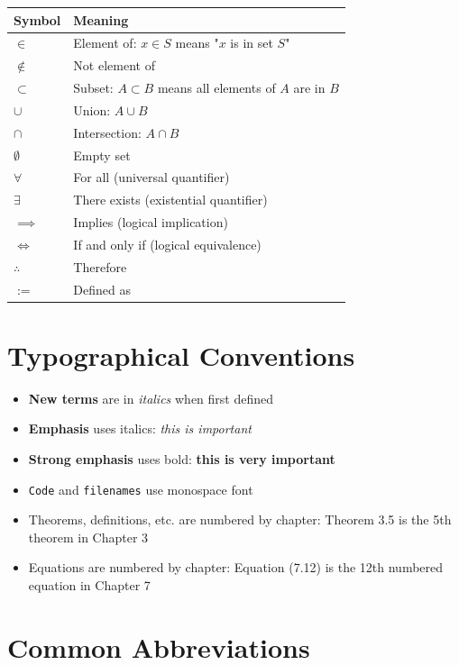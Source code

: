 \begin{center}
\begin{tabular}{ll}
\toprule
\textbf{Symbol} & \textbf{Meaning} \\
\midrule
$\in$ & Element of: $x \in S$ means "$x$ is in set $S$" \\
$\notin$ & Not element of \\
$\subset$ & Subset: $A \subset B$ means all elements of $A$ are in $B$ \\
$\cup$ & Union: $A \cup B$ \\
$\cap$ & Intersection: $A \cap B$ \\
$\emptyset$ & Empty set \\
$\forall$ & For all (universal quantifier) \\
$\exists$ & There exists (existential quantifier) \\
$\implies$ & Implies (logical implication) \\
$\iff$ & If and only if (logical equivalence) \\
$\therefore$ & Therefore \\
$:=$ & Defined as \\
\bottomrule
\end{tabular}
\end{center}

\section*{Typographical Conventions}

\begin{itemize}
\item \textbf{New terms} are in \textit{italics} when first defined
\item \textbf{Emphasis} uses italics: \textit{this is important}
\item \textbf{Strong emphasis} uses bold: \textbf{this is very important}
\item \texttt{Code} and \texttt{filenames} use monospace font
\item Theorems, definitions, etc. are numbered by chapter: Theorem 3.5 is the 5th theorem in Chapter 3
\item Equations are numbered by chapter: Equation (7.12) is the 12th numbered equation in Chapter 7
\end{itemize}

\section*{Common Abbreviations}

